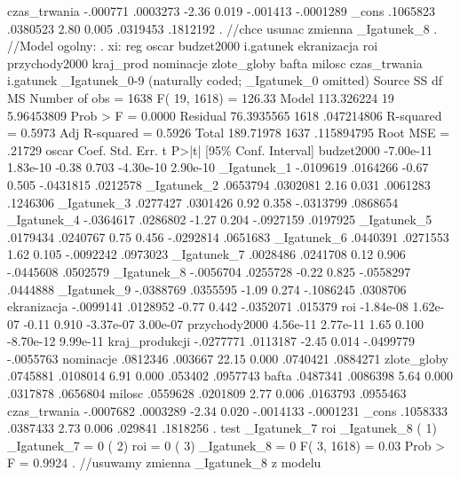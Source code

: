 \begin{stlog}
  czas_trwania {\VBAR}   -.000771   .0003273    -2.36   0.019     -.001413   -.0001289
         _cons {\VBAR}   .1065823   .0380523     2.80   0.005     .0319453    .1812192
{\smallskip}
. //chce usunac zmienna _Igatunek_8
. //Model ogolny:
. xi: reg oscar  budzet2000 i.gatunek ekranizacja roi przychody2000 kraj_prod nominacje zlote_globy bafta
 milosc czas_trwania
i.gatunek         _Igatunek_0-9       (naturally coded; _Igatunek_0 omitted)
{\smallskip}
      Source {\VBAR}       SS       df       MS              Number of obs =    1638
           F( 19,  1618) =  126.33
       Model {\VBAR}  113.326224    19  5.96453809           Prob > F      =  0.0000
    Residual {\VBAR}  76.3935565  1618  .047214806           R-squared     =  0.5973
           Adj R-squared =  0.5926
       Total {\VBAR}   189.71978  1637  .115894795           Root MSE      =  .21729
{\smallskip}
         oscar {\VBAR}      Coef.   Std. Err.      t    P>|t|     [95\% Conf. Interval]
    budzet2000 {\VBAR}  -7.00e-11   1.83e-10    -0.38   0.703    -4.30e-10    2.90e-10
   _Igatunek_1 {\VBAR}  -.0109619   .0164266    -0.67   0.505    -.0431815    .0212578
   _Igatunek_2 {\VBAR}   .0653794   .0302081     2.16   0.031     .0061283    .1246306
   _Igatunek_3 {\VBAR}   .0277427   .0301426     0.92   0.358    -.0313799    .0868654
   _Igatunek_4 {\VBAR}  -.0364617   .0286802    -1.27   0.204    -.0927159    .0197925
   _Igatunek_5 {\VBAR}   .0179434   .0240767     0.75   0.456    -.0292814    .0651683
   _Igatunek_6 {\VBAR}   .0440391   .0271553     1.62   0.105    -.0092242    .0973023
   _Igatunek_7 {\VBAR}   .0028486   .0241708     0.12   0.906    -.0445608    .0502579
   _Igatunek_8 {\VBAR}  -.0056704   .0255728    -0.22   0.825    -.0558297    .0444888
   _Igatunek_9 {\VBAR}  -.0388769   .0355595    -1.09   0.274    -.1086245    .0308706
   ekranizacja {\VBAR}  -.0099141   .0128952    -0.77   0.442    -.0352071     .015379
           roi {\VBAR}  -1.84e-08   1.62e-07    -0.11   0.910    -3.37e-07    3.00e-07
 przychody2000 {\VBAR}   4.56e-11   2.77e-11     1.65   0.100    -8.70e-12    9.99e-11
kraj_produkcji {\VBAR}  -.0277771   .0113187    -2.45   0.014    -.0499779   -.0055763
     nominacje {\VBAR}   .0812346    .003667    22.15   0.000     .0740421    .0884271
   zlote_globy {\VBAR}   .0745881   .0108014     6.91   0.000      .053402    .0957743
         bafta {\VBAR}   .0487341   .0086398     5.64   0.000     .0317878    .0656804
        milosc {\VBAR}   .0559628   .0201809     2.77   0.006     .0163793    .0955463
  czas_trwania {\VBAR}  -.0007682   .0003289    -2.34   0.020    -.0014133   -.0001231
         _cons {\VBAR}   .1058333   .0387433     2.73   0.006      .029841    .1818256
{\smallskip}
. test _Igatunek_7 roi _Igatunek_8
{\smallskip}
 ( 1)  _Igatunek_7 = 0
 ( 2)  roi = 0
 ( 3)  _Igatunek_8 = 0
{\smallskip}
       F(  3,  1618) =    0.03
            Prob > F =    0.9924
{\smallskip}
. //usuwamy zmienna _Igatunek_8 z modelu\\
\end{stlog}
